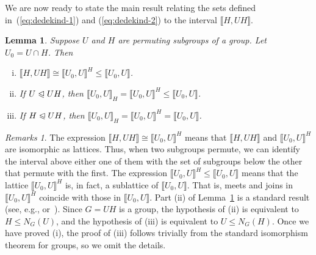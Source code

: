 \documentclass{gen-j-l}
\newcommand{\lb}{\ensuremath{\llbracket}}
\newcommand{\rb}{\ensuremath{\rrbracket}}
\newcommand{\<}{\ensuremath{\langle}}
\renewcommand{\>}{\ensuremath{\rangle}}
\theoremstyle{plain}
\newtheorem{lemma}[theorem]{Lemma}
\theoremstyle{definition}
\theoremstyle{remark}
\newtheorem*{remarks}{Remarks}
\numberwithin{theorem}{section}
\numberwithin{claim}{section}
\numberwithin{equation}{section}
\numberwithin{conjecture}{section}
\renewcommand{\leq}{\ensuremath{\leqslant}}
\newcommand{\subnormal}{\ensuremath{\trianglelefteqslant}}
\newcommand{\2}{\ensuremath{\mathbf{2}}}
\newcommand{\3}{\ensuremath{\mathbf{3}}}
\begin{document}
We are now ready to state the main result relating the sets defined
in~(\ref{eq:dedekind-1}) and (\ref{eq:dedekind-2}) %
to the interval $\lb H, UH \rb$.
\begin{lemma}
  \label{lemma-wjd-4}
Suppose $U$ and $H$ are permuting subgroups of a group. %
Let $U_0 = U\cap H$.  Then
\begin{enumerate}[(i)]
\item $\lb H, UH \rb  \cong  \lb U_0, U \rb^H \leq \lb U_0, U \rb$.
\item If $U \subnormal UH$, then  $\lb U_0, U \rb_H  = \lb U_0, U \rb^H \leq \lb U_0, U \rb$.
\item If $H \subnormal UH$,  then  $\lb U_0, U \rb_H  = \lb U_0, U \rb^H = \lb U_0, U \rb$.
\end{enumerate}
\end{lemma}
\begin{remarks}
The expression $\lb H, UH \rb  \cong  \lb U_0, U \rb^H$ means
that $\lb H, UH \rb$ and $\lb U_0, U \rb^H$ are isomorphic as lattices. Thus,
when two subgroups permute, we can identify the interval above either one of 
them with the set of subgroups below the other that permute with the first.  
The expression $\lb U_0, U \rb^H \leq \lb U_0, U \rb$ means that
the lattice $\lb U_0, U \rb^H$ is, in fact, a sublattice of 
$\lb U_0, U \rb$. That is, meets and joins in
$\lb U_0, U \rb^H$ coincide with those in $\lb U_0, U \rb$.
Part (ii) of Lemma~\ref{lemma-wjd-4} is a standard result (see, e.g.,
\cite{Borner:1999} or~\cite{Isaacs:2008}).
Since $G=UH$ is a group, the hypothesis of (ii) is equivalent to
$H\leq N_G(U)$, and the hypothesis of (iii) is equivalent to $U\leq N_G(H)$.
Once we have proved (i), the
proof of (iii) follows trivially from the standard isomorphism theorem for
groups, so we omit the details.
\end{remarks}
\end{document}
